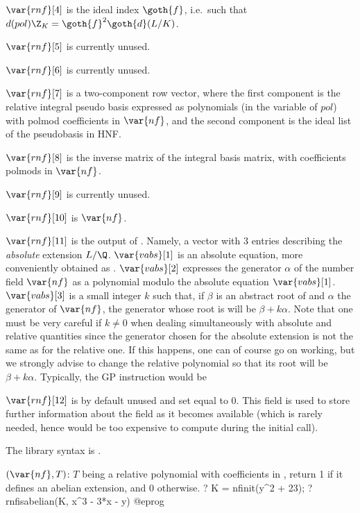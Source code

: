 $\var{rnf}[4]$ is the ideal index $\goth{f}$, i.e.~such that
$d(pol)\Z_K=\goth{f}^2\goth{d}(L/K)$.

$\var{rnf}[5]$ is currently unused.

$\var{rnf}[6]$ is currently unused.

$\var{rnf}[7]$ is a two-component row vector, where the first component is
the relative integral pseudo basis expressed as polynomials (in the variable of
$pol$) with polmod coefficients in $\var{nf}$, and the second component is the
ideal list of the pseudobasis in HNF.

$\var{rnf}[8]$ is the inverse matrix of the integral basis matrix, with
coefficients polmods in $\var{nf}$.

$\var{rnf}[9]$ is currently unused.

$\var{rnf}[10]$ is $\var{nf}$.

$\var{rnf}[11]$ is the output of . Namely, a
vector  with 3 entries describing the \emph{absolute} extension
$L/\Q$. $\var{vabs}[1]$ is an absolute equation, more conveniently obtained
as . $\var{vabs}[2]$ expresses the generator $\alpha$ of the
number field $\var{nf}$ as a polynomial modulo the absolute equation
$\var{vabs}[1]$. $\var{vabs}[3]$ is a small integer $k$ such that, if $\beta$
is an abstract root of  and $\alpha$ the generator of $\var{nf}$,
the generator whose root is  will be
$\beta + k \alpha$. Note that one must be very careful if $k\neq0$ when
dealing simultaneously with absolute and relative quantities since the
generator chosen for the absolute extension is not the same as for the
relative one. If this happens, one can of course go on working, but we
strongly advise to change the relative polynomial so that its root will be
$\beta + k \alpha$. Typically, the GP instruction would be


$\var{rnf}[12]$ is by default unused and set equal to 0. This
field is used to store further information about the field as it becomes
available (which is rarely needed, hence would be too expensive to compute
during the initial  call).

The library syntax is .

$(\var{nf},T)$: \label{se:rnfisabelian}$T$ being a relative polynomial with coefficients
in , return 1 if it defines an abelian extension, and 0 otherwise.
\bprog
? K = nfinit(y^2 + 23);
? rnfisabelian(K, x^3 - 3*x - y)
@eprog

